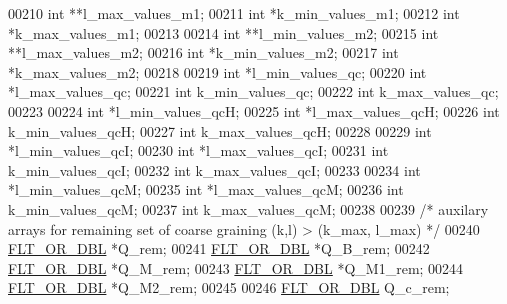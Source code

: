 \begin{DoxyCode}
00210   \textcolor{keywordtype}{int}                   **l\_max\_values\_m1;
00211   \textcolor{keywordtype}{int}                   *k\_min\_values\_m1;
00212   \textcolor{keywordtype}{int}                   *k\_max\_values\_m1;
00213 
00214   \textcolor{keywordtype}{int}                   **l\_min\_values\_m2;
00215   \textcolor{keywordtype}{int}                   **l\_max\_values\_m2;
00216   \textcolor{keywordtype}{int}                   *k\_min\_values\_m2;
00217   \textcolor{keywordtype}{int}                   *k\_max\_values\_m2;
00218 
00219   \textcolor{keywordtype}{int}                   *l\_min\_values\_qc;
00220   \textcolor{keywordtype}{int}                   *l\_max\_values\_qc;
00221   \textcolor{keywordtype}{int}                   k\_min\_values\_qc;
00222   \textcolor{keywordtype}{int}                   k\_max\_values\_qc;
00223 
00224   \textcolor{keywordtype}{int}                   *l\_min\_values\_qcH;
00225   \textcolor{keywordtype}{int}                   *l\_max\_values\_qcH;
00226   \textcolor{keywordtype}{int}                   k\_min\_values\_qcH;
00227   \textcolor{keywordtype}{int}                   k\_max\_values\_qcH;
00228 
00229   \textcolor{keywordtype}{int}                   *l\_min\_values\_qcI;
00230   \textcolor{keywordtype}{int}                   *l\_max\_values\_qcI;
00231   \textcolor{keywordtype}{int}                   k\_min\_values\_qcI;
00232   \textcolor{keywordtype}{int}                   k\_max\_values\_qcI;
00233 
00234   \textcolor{keywordtype}{int}                   *l\_min\_values\_qcM;
00235   \textcolor{keywordtype}{int}                   *l\_max\_values\_qcM;
00236   \textcolor{keywordtype}{int}                   k\_min\_values\_qcM;
00237   \textcolor{keywordtype}{int}                   k\_max\_values\_qcM;
00238 
00239   \textcolor{comment}{/* auxilary arrays for remaining set of coarse graining (k,l) > (k\_max, l\_max) */}
00240   \hyperlink{group__data__structures_ga31125aeace516926bf7f251f759b6126}{FLT\_OR\_DBL}            *Q\_rem;
00241   \hyperlink{group__data__structures_ga31125aeace516926bf7f251f759b6126}{FLT\_OR\_DBL}            *Q\_B\_rem;
00242   \hyperlink{group__data__structures_ga31125aeace516926bf7f251f759b6126}{FLT\_OR\_DBL}            *Q\_M\_rem;
00243   \hyperlink{group__data__structures_ga31125aeace516926bf7f251f759b6126}{FLT\_OR\_DBL}            *Q\_M1\_rem;
00244   \hyperlink{group__data__structures_ga31125aeace516926bf7f251f759b6126}{FLT\_OR\_DBL}            *Q\_M2\_rem;
00245 
00246   \hyperlink{group__data__structures_ga31125aeace516926bf7f251f759b6126}{FLT\_OR\_DBL}            Q\_c\_rem;

\end{DoxyCode}
